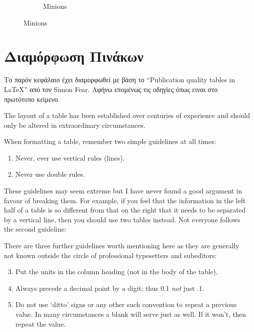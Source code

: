 \begin{landscape}
\begin{figure}
\begin{subfigure}[b]{0.3\textwidth}
    \caption{Minions}
    \label{fig:Minnion}
  \end{subfigure}
  \label{fig:animations}
\end{figure}


\end{landscape}



\section{Διαμόρφωση Πινάκων}

Το παρόν κεφάλαιο έχει διαμορφωθεί με βάση το ``Publication quality tables in \LaTeX*''
 από τον Simon Fear. Αφήνω επομένως τις οδηγίες όπως ειναι στο πρωτότυπο κείμενο.

The layout of a table has been established over centuries of experience and 
should only be altered in extraordinary circumstances. 

When formatting a table, remember two simple guidelines at all times:

\begin{enumerate}
  \item Never, ever use vertical rules (lines).
  \item Never use double rules.
\end{enumerate}

These guidelines may seem extreme but I have
never found a good argument in favour of breaking them. For
example, if you feel that the information in the left half of
a table is so different from that on the right that it needs
to be separated by a vertical line, then you should use two
tables instead. Not everyone follows the second guideline:

There are three further guidelines worth mentioning here as they
are generally not known outside the circle of professional
typesetters and subeditors:

\begin{enumerate}\setcounter{enumi}{2}
  \item Put the units in the column heading (not in the body of
          the table).
  \item Always precede a decimal point by a digit; thus 0.1
      {\em not} just .1.
  \item Do not use `ditto' signs or any other such convention to
      repeat a previous value. In many circumstances a blank
      will serve just as well. If it won't, then repeat the value.
\end{enumerate}


